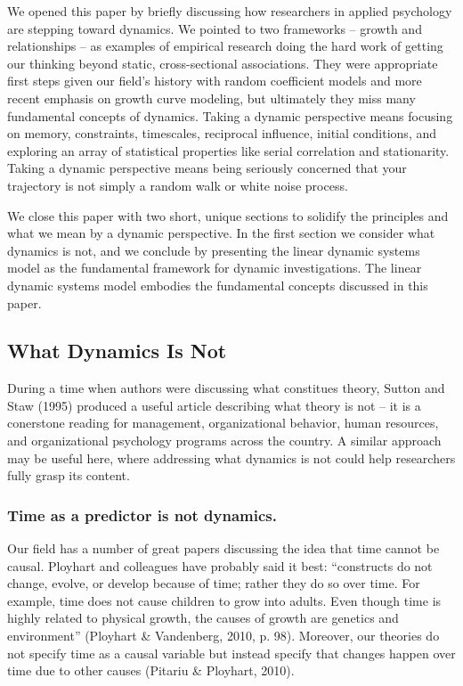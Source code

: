 \documentclass[english,,man]{apa6}
\begin{document}
We opened this paper by briefly discussing how researchers in applied psychology are stepping toward dynamics. We pointed to two frameworks -- growth and relationships -- as examples of empirical research doing the hard work of getting our thinking beyond static, cross-sectional associations. They were appropriate first steps given our field's history with random coefficient models and more recent emphasis on growth curve modeling, but ultimately they miss many fundamental concepts of dynamics. Taking a dynamic perspective means focusing on memory, constraints, timescales, reciprocal influence, initial conditions, and exploring an array of statistical properties like serial correlation and stationarity. Taking a dynamic perspective means being seriously concerned that your trajectory is not simply a random walk or white noise process.

We close this paper with two short, unique sections to solidify the principles and what we mean by a dynamic perspective. In the first section we consider what dynamics is not, and we conclude by presenting the linear dynamic systems model as the fundamental framework for dynamic investigations. The linear dynamic systems model embodies the fundamental concepts discussed in this paper.

\hypertarget{what-dynamics-is-not}{%
\subsection{What Dynamics Is Not}\label{what-dynamics-is-not}}

During a time when authors were discussing what constitues theory, Sutton and Staw (1995) produced a useful article describing what theory is not -- it is a conerstone reading for management, organizational behavior, human resources, and organizational psychology programs across the country. A similar approach may be useful here, where addressing what dynamics is not could help researchers fully grasp its content.

\hypertarget{time-as-a-predictor-is-not-dynamics.}{%
\subsubsection{Time as a predictor is not dynamics.}\label{time-as-a-predictor-is-not-dynamics.}}

Our field has a number of great papers discussing the idea that time cannot be causal. Ployhart and colleagues have probably said it best: \enquote{constructs do not change, evolve, or develop because of time; rather they do so over time. For example, time does not cause children to grow into adults. Even though time is highly related to physical growth, the causes of growth are genetics and environment} (Ployhart \& Vandenberg, 2010, p. 98). Moreover, our theories do not specify time as a causal variable but instead specify that changes happen over time due to other causes (Pitariu \& Ployhart, 2010).
\end{document}
